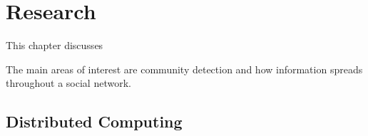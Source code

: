 \chapter{Research}
This chapter discusses 

The main areas of interest are community detection and how information spreads throughout a social network. 


% 
% 

% 

\section{Distributed Computing}

